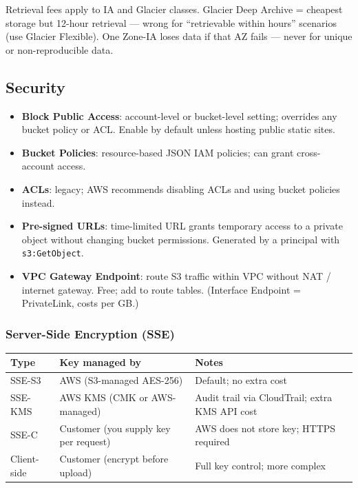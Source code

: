 \begin{examtip}
Retrieval fees apply to IA and Glacier classes. Glacier Deep Archive = cheapest storage but
12-hour retrieval --- wrong for ``retrievable within hours'' scenarios (use Glacier Flexible).
One Zone-IA loses data if that AZ fails --- never for unique or non-reproducible data.
\end{examtip}

\subsection{Security}

\begin{itemize}
  \item \textbf{Block Public Access}: account-level or bucket-level setting;
        overrides any bucket policy or ACL. Enable by default unless hosting public static sites.
  \item \textbf{Bucket Policies}: resource-based JSON IAM policies; can grant cross-account access.
  \item \textbf{ACLs}: legacy; AWS recommends disabling ACLs and using bucket policies instead.
  \item \textbf{Pre-signed URLs}: time-limited URL grants temporary access to a private object
        without changing bucket permissions. Generated by a principal with \texttt{s3:GetObject}.
  \item \textbf{VPC Gateway Endpoint}: route S3 traffic within VPC without NAT / internet gateway.
        Free; add to route tables. (Interface Endpoint = PrivateLink, costs per GB.)
\end{itemize}

\subsubsection{Server-Side Encryption (SSE)}

\begin{comparebox}[title={S3 encryption options}]
\begin{tabular}{@{}p{2.5cm}p{4cm}p{5cm}@{}}
\toprule
\textbf{Type} & \textbf{Key managed by} & \textbf{Notes} \\
\midrule
SSE-S3  & AWS (S3-managed AES-256) & Default; no extra cost \\
SSE-KMS & AWS KMS (CMK or AWS-managed) & Audit trail via CloudTrail; extra KMS API cost \\
SSE-C   & Customer (you supply key per request) & AWS does not store key; HTTPS required \\
Client-side & Customer (encrypt before upload) & Full key control; more complex \\
\bottomrule
\end{tabular}
\end{comparebox}


